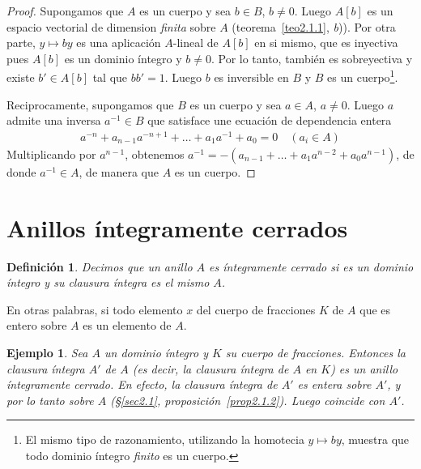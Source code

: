 \documentclass[10pt,oneside,bibtotoc,smallheadings,leqno,a5paper,DIV=12]{scrbook}
\numberwithin{equation}{section}
\theoremstyle{defi}
\newtheorem*{definition*}{Definici\'on}
\theoremstyle{enonce}
\theoremstyle{rem}
\newtheorem{example}{Ejemplo}
\numberwithin{theorem}{section}
\numberwithin{proposition}{section}
\numberwithin{definition}{section}
\numberwithin{lemma}{section}
\numberwithin{corollary}{section}
\numberwithin{example}{section}
\numberwithin{footnote}{section}%
\begin{document}
\begin{proof}
Supongamos que $A$ es un cuerpo y sea $b\in B$, $b\neq 0$. Luego $A[b]$ es un espacio vectorial de
dimension {\em finita} sobre $A$ (teorema~\ref{teo2.1.1}, {\itshape b})).
Por otra parte, $y\mapsto by$ es una aplicaci\'on
$A$-lineal de $A[b]$ en si mismo, que es inyectiva pues $A[b]$ es un dominio \'integro y $b\neq 0$. Por
lo tanto, tambi\'en es sobreyectiva y existe $b'\in A[b]$ tal que $bb' =1$. Luego $b$ es inversible en $B$
y $B$ es un cuerpo\footnote{El mismo tipo de razonamiento, utilizando la homotecia $y\mapsto by$, muestra
que todo dominio \'integro {\em finito} es un cuerpo.}.

Reciprocamente, supongamos que $B$ es un cuerpo y sea $a\in A$, $a\neq 0$. Luego $a$ admite una inversa
$a^{-1}\in B$ que satisface une ecuaci\'on de dependencia entera
\begin{gather*}
a^{-n}+a_{n-1}a^{-n+1}+\dots+a_{1}a^{-1}+a_{0} =0\quad(a_{i}\in A)
\end{gather*}
Multiplicando por $a^{n-1}$, obtenemos $a^{-1}=-(a_{n-1}+\dots+a_{1}a^{n-2}+a_{0}a^{n-1})$, de donde
$a^{-1}\in A$, de manera que $A$ es un cuerpo.
\end{proof}

\section{Anillos \'integramente cerrados}\label{sec2.2}

\begin{definition*}
Decimos que un anillo $A$ es \'integramente cerrado si es un dominio \'integro y su clausura \'integra es
el mismo $A$.
\end{definition*}

En otras palabras, si todo elemento $x$ del cuerpo de fracciones $K$ de $A$ que es entero sobre $A$
es un elemento de $A$.

\begin{example}
Sea $A$ un dominio \'integro y $K$ su cuerpo de fracciones. Entonces la {\em clausura \'integra} $A'$
de $A$ (es decir, la clausura \'integra de $A$ en $K$) es un anillo \'integramente cerrado. En efecto, la
clausura \'integra de $A'$ es entera sobre $A'$, y por lo tanto sobre $A$ (\S\ref{sec2.1}, proposici\'on~\ref{prop2.1.2}).
Luego coincide con $A'$.
\end{example}
\end{document}
